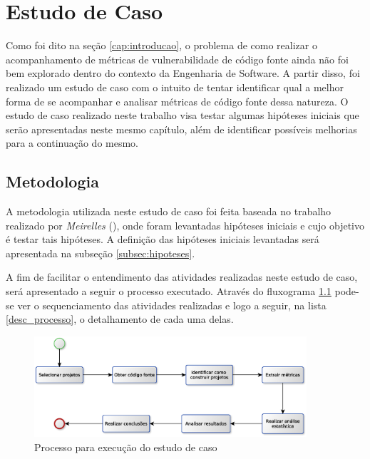 \chapter{Estudo de Caso} \label{estudodecaso}

Como foi dito na seção \ref{cap:introducao}, o problema de como realizar o
acompanhamento de métricas de vulnerabilidade de código fonte ainda não foi bem
explorado dentro do contexto da Engenharia de Software. A partir disso,
foi realizado um estudo de caso com o intuito de tentar identificar qual a melhor forma
de se acompanhar e analisar métricas de código fonte dessa natureza. O estudo
de caso realizado neste trabalho visa testar algumas hipóteses iniciais que serão apresentadas
neste mesmo capítulo, além de identificar possíveis melhorias para a continuação
do mesmo.

\section{Metodologia} \label{sec:metodologia}

A metodologia utilizada neste estudo de caso foi feita baseada no trabalho
realizado por \emph{Meirelles} (\citeyear{meirelles2013}), onde foram levantadas
hipóteses iniciais e cujo objetivo é testar tais hipóteses. A definição das
hipóteses iniciais levantadas será apresentada na subseção \ref{subsec:hipoteses}.

A fim de facilitar o entendimento das atividades realizadas neste estudo de
caso, será apresentado a seguir o processo executado. Através do
fluxograma \ref{fig:processo_estudo_de_caso} pode-se ver o sequenciamento das
atividades realizadas e logo a seguir, na lista \ref{desc_processo}, o
detalhamento de cada uma delas.

\begin{figure}[h]
  \centering
  \includegraphics[width=0.9\textwidth]
      {figuras/estudo_de_caso_processo.eps}
  \caption{Processo para execução do estudo de caso}
  \label{fig:processo_estudo_de_caso}
\end{figure}

